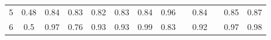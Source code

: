 \documentclass[twoside,11pt]{article}
\begin{document}
\begin{table}[H]
{\begin{tabular}{cccccccclclcc}
\multicolumn{1}{|c|}{5}                                                                           & \multicolumn{1}{c|}{0.48}                                                           & \multicolumn{1}{c|}{\cellcolor[HTML]{ECF4FF}0.84}                                              & \multicolumn{1}{c|}{0.83}                                                                & \multicolumn{1}{c|}{0.82}                                                                & \multicolumn{1}{c|}{0.83}                                                                & \multicolumn{1}{c|}{\cellcolor[HTML]{ECF4FF}0.84}                                           & \multicolumn{1}{c|}{\cellcolor[HTML]{FFCCC9}0.96}                                           & \multicolumn{1}{l|}{}                                                                          & \multicolumn{1}{c|}{\cellcolor[HTML]{ECF4FF}0.84}                                           & \multicolumn{1}{l|}{}                    & \multicolumn{1}{c|}{0.85}                                                                      & \multicolumn{1}{c|}{0.87}                                                                      \\ \cline{1-1}
\multicolumn{1}{|c|}{6}                                                                           & \multicolumn{1}{c|}{0.5}                                                            & \multicolumn{1}{c|}{\cellcolor[HTML]{ECF4FF}0.97}                                              & \multicolumn{1}{c|}{0.76}                                                                & \multicolumn{1}{c|}{0.93}                                                                & \multicolumn{1}{c|}{0.93}                                                                & \multicolumn{1}{c|}{\cellcolor[HTML]{FFCCC9}0.99}                                           & \multicolumn{1}{c|}{0.83}                                                                   & \multicolumn{1}{l|}{}                                                                          & \multicolumn{1}{c|}{0.92}                                                                   & \multicolumn{1}{l|}{}                    & \multicolumn{1}{c|}{0.97}                                                                      & \multicolumn{1}{c|}{0.98}                                                                      \\ \cline{1-1}

\end{tabular}}
\end{table}
\end{document}
